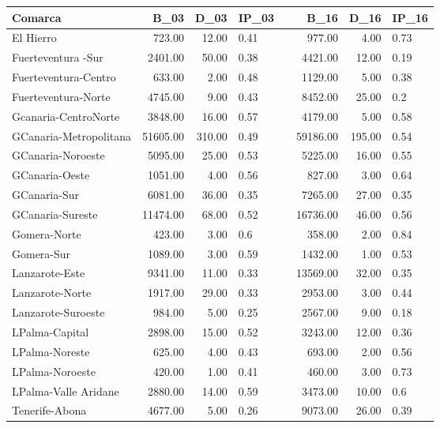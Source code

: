 \begin{table}[ht]
\centering
\begin{tabular}{lrrllrrl}
  \hline
Comarca & B\_03 & D\_03 & IP\_03 &   & B\_16 & D\_16 & IP\_16 \\ 
  \hline
El Hierro  & 723.00 & 12.00 & 0.41 &  & 977.00 & 4.00 & 0.73 \\ 
  Fuerteventura -Sur & 2401.00 & 50.00 & 0.38 &  & 4421.00 & 12.00 & 0.19 \\ 
  Fuerteventura-Centro  & 633.00 & 2.00 & 0.48 &  & 1129.00 & 5.00 & 0.38 \\ 
  Fuerteventura-Norte & 4745.00 & 9.00 & 0.43 &  & 8452.00 & 25.00 & 0.2 \\ 
  Gcanaria-CentroNorte  & 3848.00 & 16.00 & 0.57 &  & 4179.00 & 5.00 & 0.58 \\ 
  GCanaria-Metropolitana & 51605.00 & 310.00 & 0.49 &  & 59186.00 & 195.00 & 0.54 \\ 
  GCanaria-Noroeste & 5095.00 & 25.00 & 0.53 &  & 5225.00 & 16.00 & 0.55 \\ 
  GCanaria-Oeste  & 1051.00 & 4.00 & 0.56 &  & 827.00 & 3.00 & 0.64 \\ 
  GCanaria-Sur  & 6081.00 & 36.00 & 0.35 &  & 7265.00 & 27.00 & 0.35 \\ 
  GCanaria-Sureste & 11474.00 & 68.00 & 0.52 &  & 16736.00 & 46.00 & 0.56 \\ 
  Gomera-Norte & 423.00 & 3.00 & 0.6 &  & 358.00 & 2.00 & 0.84 \\ 
  Gomera-Sur & 1089.00 & 3.00 & 0.59 &  & 1432.00 & 1.00 & 0.53 \\ 
  Lanzarote-Este  & 9341.00 & 11.00 & 0.33 &  & 13569.00 & 32.00 & 0.35 \\ 
  Lanzarote-Norte  & 1917.00 & 29.00 & 0.33 &  & 2953.00 & 3.00 & 0.44 \\ 
  Lanzarote-Suroeste  & 984.00 & 5.00 & 0.25 &  & 2567.00 & 9.00 & 0.18 \\ 
  LPalma-Capital  & 2898.00 & 15.00 & 0.52 &  & 3243.00 & 12.00 & 0.36 \\ 
  LPalma-Noreste  & 625.00 & 4.00 & 0.43 &  & 693.00 & 2.00 & 0.56 \\ 
  LPalma-Noroeste  & 420.00 & 1.00 & 0.41 &  & 460.00 & 3.00 & 0.73 \\ 
  LPalma-Valle Aridane & 2880.00 & 14.00 & 0.59 &  & 3473.00 & 10.00 & 0.6 \\ 
  Tenerife-Abona  & 4677.00 & 5.00 & 0.26 &  & 9073.00 & 26.00 & 0.39 \\ 

\end{tabular}
\end{table}
